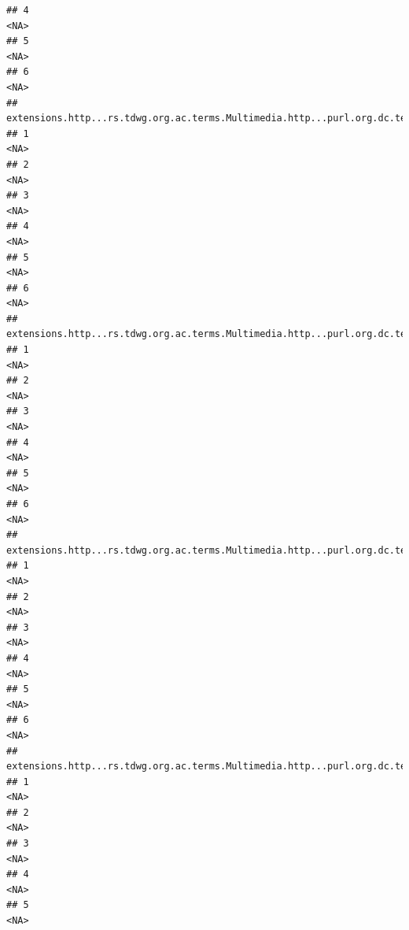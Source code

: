 \documentclass[
]{book}
\begin{document}
\begin{verbatim}
## 4                                                                                     <NA>
## 5                                                                                     <NA>
## 6                                                                                     <NA>
##   extensions.http...rs.tdwg.org.ac.terms.Multimedia.http...purl.org.dc.terms.rights
## 1                                                                              <NA>
## 2                                                                              <NA>
## 3                                                                              <NA>
## 4                                                                              <NA>
## 5                                                                              <NA>
## 6                                                                              <NA>
##   extensions.http...rs.tdwg.org.ac.terms.Multimedia.http...purl.org.dc.terms.source
## 1                                                                              <NA>
## 2                                                                              <NA>
## 3                                                                              <NA>
## 4                                                                              <NA>
## 5                                                                              <NA>
## 6                                                                              <NA>
##   extensions.http...rs.tdwg.org.ac.terms.Multimedia.http...purl.org.dc.terms.type
## 1                                                                            <NA>
## 2                                                                            <NA>
## 3                                                                            <NA>
## 4                                                                            <NA>
## 5                                                                            <NA>
## 6                                                                            <NA>
##   extensions.http...rs.tdwg.org.ac.terms.Multimedia.http...purl.org.dc.terms.format
## 1                                                                              <NA>
## 2                                                                              <NA>
## 3                                                                              <NA>
## 4                                                                              <NA>
## 5                                                                              <NA>

\end{verbatim}
\end{document}
